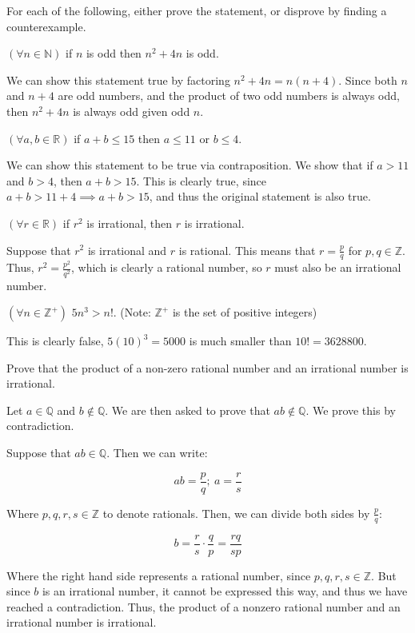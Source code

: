 \documentclass[11pt]{article}
\begin{document}
For each of the following, either prove the statement, or disprove by finding a counterexample.
\begin{Parts}
	\Part $(\forall n \in \mathbb{N})$ if $n$ is odd then $n^2 + 4n$ is odd.

    \begin{solution}
        We can show this statement true by factoring $n^2 + 4n = n(n+4)$. Since both $n$ and $n + 4$ are odd numbers, and the product of two odd numbers is always odd, then $n^2 + 4n$ is always odd given odd $n$.
    \end{solution}

	\Part $(\forall a, b \in \mathbb{R})$ if $a + b \le 15$ then $a \le 11$ or $b \le 4$.

    \begin{solution}
        We can show this statement to be true via contraposition. We show that if $a > 11$ and $b > 4$, then $a + b > 15$. This is clearly true, since $a + b > 11 + 4 \implies a + b > 15$, and thus the original statement is also true.
    \end{solution}


	\Part $(\forall r \in \mathbb{R})$ if $r^2$ is irrational, then $r$ is irrational.

\begin{solution}
    Suppose that $r^2$ is irrational and $r$ is rational. This means that $r =\frac{p}{q}$ for $p, q \in \mathbb Z$. Thus, $r^2 = \frac{p^2}{q^2}$, which is clearly a rational number, so $r$ must also be an irrational number.
\end{solution} 


	\Part $(\forall n \in \mathbb{Z}^+)$ $5n^3 > n!$. (Note: $\mathbb{Z}^+$ is the set of positive integers)

    \begin{solution}
    This is clearly false, $5(10)^3 = 5000$ is much smaller than $10! = 3628800$.
    \end{solution}
\end{Parts}

Prove that the product of a non-zero rational number and an irrational number is irrational.

\begin{solution}
    Let $a \in \mathbb Q$ and $b \notin \mathbb Q$. We are then asked to prove that $ab \notin \mathbb Q$. We prove this by contradiction.

    Suppose that $ab \in \mathbb Q$. Then we can write:

    \[ ab = \frac{p}{q}; \ a = \frac{r}{s}\]

    Where $p, q, r, s \in \mathbb Z$ to denote rationals. Then, we can divide both sides by $\frac{p}{q}$:

    \[ b = \frac{r}{s} \cdot \frac{q}{p} = \frac{rq}{sp}\] 

    Where the right hand side represents a rational number, since $p, q, r, s \in \mathbb Z$. But since $b$ is an irrational number, it cannot be expressed this way, and thus we have reached a contradiction. Thus, the product of a nonzero rational number and an irrational number is irrational.
\end{solution}
\end{document}
